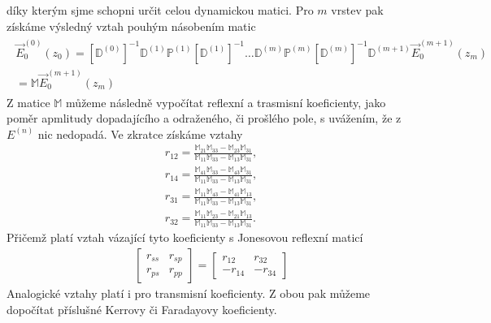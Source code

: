 díky kterým sjme schopni určit celou dynamickou matici.
Pro $m$ vrstev pak získáme výsledný vztah pouhým násobením matic
\begin{eqnarray}
\begin{split}
\vec{E}_0^{(0)}(z_0) = [\mathbb{D}^{(0)}]^{-1}\mathbb{D}^{(1)}\mathbb{P}^{(1)}[\mathbb{D}^{(1)}]^{-1}\dots \mathbb{D}^{(m)}\mathbb{P}^{(m)}[\mathbb{D}^{(m)}]^{-1}\mathbb{D}^{(m+1)}\vec{E}_0^{(m+1)}(z_m)\\
=\mathbb{M}\vec{E}_0^{(m+1)}(z_m)
\end{split}
\end{eqnarray}
Z matice $\mathbb{M}$ můžeme následně vypočítat reflexní a trasmisní koeficienty, jako poměr apmlitudy dopadajícího a odraženého, či prošlého pole, s uvážením, že z $E^{(n)}$ nic nedopadá. Ve zkratce získáme vztahy %
\begin{eqnarray}
r_{12}=\frac{\mathbb{M}_{21}\mathbb{M}_{33} - \mathbb{M}_{23}\mathbb{M}_{31}}{\mathbb{M}_{11}\mathbb{M}_{33}-\mathbb{M}_{13}\mathbb{M}_{31}}, \\
r_{14}=\frac{\mathbb{M}_{41}\mathbb{M}_{33}-\mathbb{M}_{43}\mathbb{M}_{31}}{\mathbb{M}_{11}\mathbb{M}_{33}-\mathbb{M}_{13}\mathbb{M}_{31}}, \\
r_{31}=\frac{\mathbb{M}_{11}\mathbb{M}_{43}-\mathbb{M}_{41}\mathbb{M}_{13}}{\mathbb{M}_{11}\mathbb{M}_{33}-\mathbb{M}_{13}\mathbb{M}_{31}}, \\
r_{32}=\frac{\mathbb{M}_{11}\mathbb{M}_{23}-\mathbb{M}_{21}\mathbb{M}_{13}}{\mathbb{M}_{11}\mathbb{M}_{33}-\mathbb{M}_{13}\mathbb{M}_{31}}.
\end{eqnarray}
Přičemž platí vztah vázající tyto koeficienty s Jonesovou reflexní maticí
\begin{eqnarray}
\begin{bmatrix}
r_{ss} & r_{sp} \\ r_{ps} & r_{pp} 
\end{bmatrix}
= 
\begin{bmatrix} 
r_{12} &r_{32} \\ -r_{14} & -r_{34} 
\end{bmatrix}
\end{eqnarray}
Analogické vztahy platí i pro transmisní koeficienty. Z obou pak můžeme dopočítat příslušné Kerrovy či Faradayovy koeficienty.

